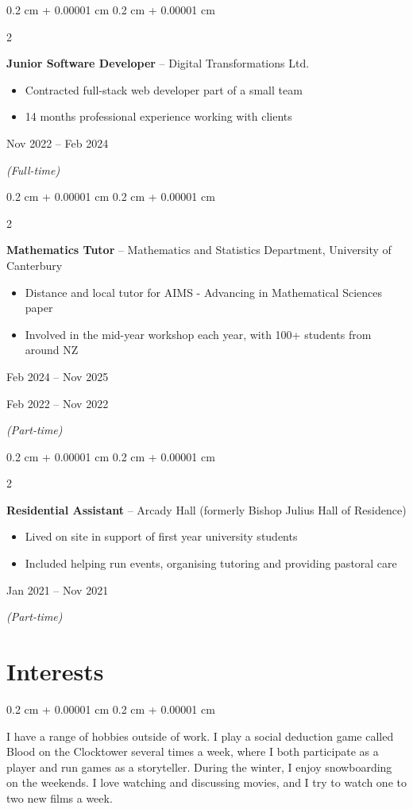 \documentclass[10pt, letterpaper]{article}
\newenvironment{highlights}{
    \begin{itemize}[
        topsep=0.10 cm,
        parsep=0.10 cm,
        partopsep=0pt,
        itemsep=0pt,
        leftmargin=0.4 cm + 10pt
    ]
}{
    \end{itemize}
} %
\newenvironment{onecolentry}{
    \begin{adjustwidth}{
        0.2 cm + 0.00001 cm
    }{
        0.2 cm + 0.00001 cm
    }
}{
    \end{adjustwidth}
} %
\newenvironment{twocolentry}[2][]{
    \onecolentry
    \def\secondColumn{#2}
    \setcolumnwidth{\fill, 4.5 cm}
    \begin{paracol}{2}
}{
    \switchcolumn \raggedleft \secondColumn
    \end{paracol}
    \endonecolentry
} %
\begin{document}
\vspace{0.2cm}

\begin{twocolentry}{
        Nov 2022 -- Feb 2024

        \textit{(Full-time)}
    }
    \textbf{Junior Software Developer} -- Digital Transformations Ltd.
    \begin{highlights}
        \item Contracted full-stack web developer part of a small team
        \item 14 months professional experience working with clients
    \end{highlights}
\end{twocolentry}

\vspace{0.2cm}

\begin{twocolentry}{
        Feb 2024 -- Nov 2025

        Feb 2022 -- Nov 2022

        \textit{(Part-time)}
    }
    \textbf{Mathematics Tutor} -- Mathematics and Statistics Department, University of Canterbury
    \begin{highlights}
        \item Distance and local tutor for AIMS - Advancing in Mathematical Sciences paper
        \item Involved in the mid-year workshop each year, with 100+ students from around NZ
    \end{highlights}
\end{twocolentry}

\vspace{0.2cm}

\begin{twocolentry}{
        Jan 2021 -- Nov 2021

        \textit{(Part-time)}
    }
    \textbf{Residential Assistant} -- Arcady Hall (formerly Bishop Julius Hall of Residence)
    \begin{highlights}
        \item Lived on site in support of first year university students
        \item Included helping run events, organising tutoring and providing pastoral care
    \end{highlights}
\end{twocolentry}

\section{Interests}
\begin{onecolentry}
    I have a range of hobbies outside of work. I play a social deduction game called Blood on the Clocktower several times a week, where I both participate as a player and run games as a storyteller. During the winter, I enjoy snowboarding on the weekends. I love watching and discussing movies, and I try to watch one to two new films a week. 
\end{onecolentry}
\end{document}
